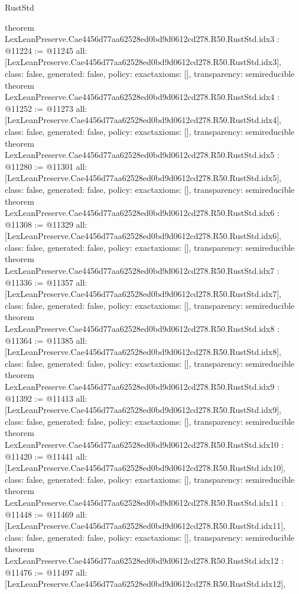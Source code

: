 \begin{lexlean}{RustStd}
\begin{coremodule}
{}
theorem LexLeanPreserve.Cae4456d77aa62528ed0bd9d0612cd278.R50.RustStd.idx3 : @11224 := @11245 {
  all: [LexLeanPreserve.Cae4456d77aa62528ed0bd9d0612cd278.R50.RustStd.idx3],
  class: false,
  generated: false,
  policy: exact{axioms: []},
  transparency: semireducible
}
theorem LexLeanPreserve.Cae4456d77aa62528ed0bd9d0612cd278.R50.RustStd.idx4 : @11252 := @11273 {
  all: [LexLeanPreserve.Cae4456d77aa62528ed0bd9d0612cd278.R50.RustStd.idx4],
  class: false,
  generated: false,
  policy: exact{axioms: []},
  transparency: semireducible
}
theorem LexLeanPreserve.Cae4456d77aa62528ed0bd9d0612cd278.R50.RustStd.idx5 : @11280 := @11301 {
  all: [LexLeanPreserve.Cae4456d77aa62528ed0bd9d0612cd278.R50.RustStd.idx5],
  class: false,
  generated: false,
  policy: exact{axioms: []},
  transparency: semireducible
}
theorem LexLeanPreserve.Cae4456d77aa62528ed0bd9d0612cd278.R50.RustStd.idx6 : @11308 := @11329 {
  all: [LexLeanPreserve.Cae4456d77aa62528ed0bd9d0612cd278.R50.RustStd.idx6],
  class: false,
  generated: false,
  policy: exact{axioms: []},
  transparency: semireducible
}
theorem LexLeanPreserve.Cae4456d77aa62528ed0bd9d0612cd278.R50.RustStd.idx7 : @11336 := @11357 {
  all: [LexLeanPreserve.Cae4456d77aa62528ed0bd9d0612cd278.R50.RustStd.idx7],
  class: false,
  generated: false,
  policy: exact{axioms: []},
  transparency: semireducible
}
theorem LexLeanPreserve.Cae4456d77aa62528ed0bd9d0612cd278.R50.RustStd.idx8 : @11364 := @11385 {
  all: [LexLeanPreserve.Cae4456d77aa62528ed0bd9d0612cd278.R50.RustStd.idx8],
  class: false,
  generated: false,
  policy: exact{axioms: []},
  transparency: semireducible
}
theorem LexLeanPreserve.Cae4456d77aa62528ed0bd9d0612cd278.R50.RustStd.idx9 : @11392 := @11413 {
  all: [LexLeanPreserve.Cae4456d77aa62528ed0bd9d0612cd278.R50.RustStd.idx9],
  class: false,
  generated: false,
  policy: exact{axioms: []},
  transparency: semireducible
}
theorem LexLeanPreserve.Cae4456d77aa62528ed0bd9d0612cd278.R50.RustStd.idx10 : @11420 := @11441 {
  all: [LexLeanPreserve.Cae4456d77aa62528ed0bd9d0612cd278.R50.RustStd.idx10],
  class: false,
  generated: false,
  policy: exact{axioms: []},
  transparency: semireducible
}
theorem LexLeanPreserve.Cae4456d77aa62528ed0bd9d0612cd278.R50.RustStd.idx11 : @11448 := @11469 {
  all: [LexLeanPreserve.Cae4456d77aa62528ed0bd9d0612cd278.R50.RustStd.idx11],
  class: false,
  generated: false,
  policy: exact{axioms: []},
  transparency: semireducible
}
theorem LexLeanPreserve.Cae4456d77aa62528ed0bd9d0612cd278.R50.RustStd.idx12 : @11476 := @11497 {
  all: [LexLeanPreserve.Cae4456d77aa62528ed0bd9d0612cd278.R50.RustStd.idx12],
}
\end{coremodule}
\end{lexlean}
